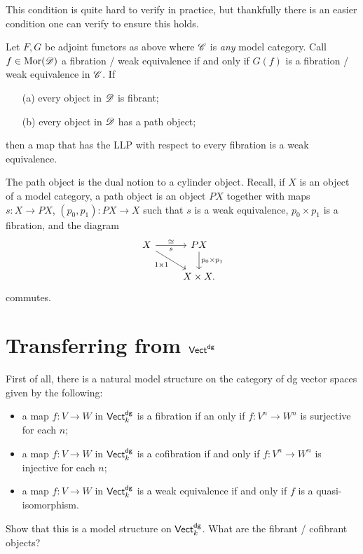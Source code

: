 \documentclass[11pt]{amsart}
\begin{document}
This condition is quite hard to verify in practice, but thankfully there is an easier condition one can verify to ensure this holds. 

\begin{prop}\label{prop: easy}
Let $F,G$ be adjoint functors as above where $\mathscr C$ is {\em any} model category. 
Call $f \in {\rm Mor}(\mathscr D)$ a fibration / weak equivalence if and only if $G(f)$ is a fibration / weak equivalence in $\mathscr C$. 
If
\begin{itemize}
\item[(a)] every object in $\mathscr D$ is fibrant;
\item[(b)] every object in $\mathscr D$ has a path object;
\end{itemize}
then a map that has the LLP with respect to every fibration is a weak equivalence.
\end{prop}

\begin{rmk}
The path object is the dual notion to a cylinder object.
Recall, if $X$ is an object of a model category, a path object is an object $PX$ together with maps $s : X \to PX$, $(p_0,p_1) : PX \to X$ such that $s$ is a weak equivalence, $p_0 \times p_1$ is a fibration, and the diagram
\[
\begin{tikzcd}
X \ar[r,"s"', "\simeq"]  \ar[dr, "1 \times 1"'] & P X \ar[d, "p_0 \times p_1"] \\
& X \times X .
\end{tikzcd}
\]
commutes.
\end{rmk}

\section{Transferring from ${\sf Vect}^{\sf dg}$}

First of all, there is a natural model structure on the category of dg vector spaces given by the following:
\begin{itemize}
\item a map $f : V \to W$ in ${\sf Vect}^{\sf dg}_k$ is a fibration if an only if $f : V^n \to W^n$ is surjective for each $n$;
\item a map $f : V \to W$ in ${\sf Vect}^{\sf dg}_k$ is a cofibration if and only if $f : V^n \to W^n$ is injective for each $n$;
\item a map $f : V \to W$ in ${\sf Vect}^{\sf dg}_k$ is a weak equivalence if and only if $f$ is a quasi-isomorphism. 
\end{itemize}

\begin{ex}
Show that this is a model structure on ${\sf Vect}^{\sf dg}_k$.
What are the fibrant / cofibrant objects?
\end{ex}
\end{document}
